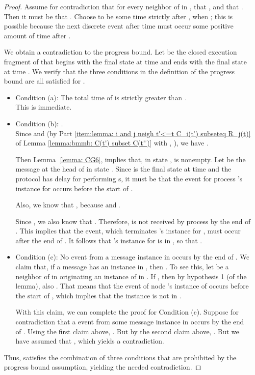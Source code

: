 \begin{proof}
Assume for contradiction that
 for every neighbor  of  in ,
that , and
that .
Then it must be that .
Choose  to be some time strictly after ,
when ; this is possible because the next
discrete event after time  must occur some positive
amount of time after .



We obtain a contradiction to the progress bound.
Let  be the closed execution fragment of  that begins
with the final state  at time  and ends with the final state
 at time .  We verify that the three conditions in the
definition of the progress bound are all satisfied for .
\begin{itemize}
\item
Condition (a):  The total time of  is strictly greater
than .  \\
This is immediate.

\item
Condition (b):  . \\
Since  and 
(by Part
\ref{item:lemma: i and j neigh t'<=t C_i(t') subseteq R_j(t)}
of Lemma \ref{lemma:bmmb: C(t') subset C(t'')} with , ),
we have
.


Then Lemma~\ref{lemma: CG6},
implies that, in state ,
 is nonempty.
Let  be the message at the head of  in state .
Since  is the final state at time  and the protocol has 
delay for performing s, it must be that the  event for
process 's instance for  occurs before the start of .

Also, we know that , because  and
.

Since , we also know that .
Therefore,  is not received by process  by the end of
.
This implies that the  event, which terminates 's
instance for , must occur after the end of .
It follows that 's instance for  is in ,
so that .

\item
Condition (c):  No  event from a message instance in
 occurs by the end of .
We claim that, if a message  has an instance in
, then .
To see this, let  be a neighbor of  in  originating an instance of
 in .
If , then by hypothesis 1 (of the lemma), also .
That means that the  event of node 's instance of 
occurs before the start of , which implies that the instance
is not in .



With this claim, we can complete the proof for Condition (c).
Suppose for contradiction that a  event from some message
instance in  occurs by the end of .
Using the first claim above, .
But by the second claim above, .
But we have assumed that , which yields a
contradiction.
\end{itemize}

Thus,  satisfies the combination of three conditions that
are prohibited by the progress bound assumption, yielding the needed
contradiction.
\end{proof}





